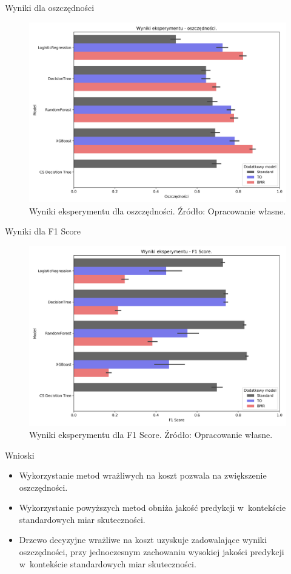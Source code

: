 \documentclass{beamer}
\begin{document}
\begin{frame}{Wyniki dla oszczędności}
	\begin{figure}
		\includegraphics[width=0.8\linewidth]{images/100_config1-Savings.png}
		\caption{Wyniki eksperymentu dla oszczędności. Źródło: Opracowanie własne.}
	\end{figure}
\end{frame}

\begin{frame}{Wyniki dla F1 Score}
	\begin{figure}
		\includegraphics[width=0.8\linewidth]{images/100_config1-F1.png}
		\caption{Wyniki eksperymentu dla F1 Score. Źródło: Opracowanie własne.}
	\end{figure}
\end{frame}

\begin{frame}{Wnioski}
	\begin{itemize}
		\item Wykorzystanie metod wrażliwych na koszt pozwala na zwiększenie oszczędności. 
		\item Wykorzystanie powyższych metod obniża jakość predykcji w~kontekście standardowych miar skuteczności. 
		\item Drzewo decyzyjne wrażliwe na koszt uzyskuje zadowalające wyniki oszczędności, przy jednoczesnym zachowaniu wysokiej jakości predykcji w~kontekście standardowych miar skuteczności. 
	\end{itemize}
\end{frame}
\end{document}
